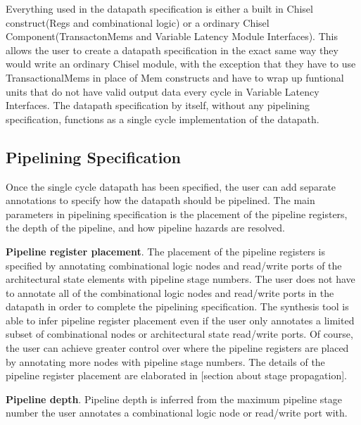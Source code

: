 Everything used in the datapath specification is either a built in
Chisel construct(Regs and combinational logic) or a ordinary Chisel
Component(TransactonMems and Variable Latency Module Interfaces). This
allows the user to create a datapath specification in the exact same
way they would write an ordinary Chisel module, with the exception
that they have to use TransactionalMems in place of Mem constructs and
have to wrap up funtional units that do not have valid output data
every cycle in Variable Latency Interfaces. The datapath specification
by itself, without any pipelining specification, functions as a single
cycle implementation of the datapath.

\subsection {Pipelining Specification}
Once the single cycle datapath has been specified, the user can add
separate annotations to specify how the datapath should be
pipelined. The main parameters in pipelining specification is the
placement of the pipeline registers, the depth of the pipeline, and
how pipeline hazards are resolved.

{\bf Pipeline register placement}. The placement of the pipeline
registers is specified by annotating combinational logic nodes and
read/write ports of the architectural state elements with pipeline
stage numbers. The user does not have to annotate all of the
combinational logic nodes and read/write ports in the datapath in
order to complete the pipelining specification. The synthesis tool is
able to infer pipeline register placement even if the user only
annotates a limited subset of combinational nodes or architectural
state read/write ports. Of course, the user can achieve greater
control over where the pipeline registers are placed by annotating
more nodes with pipeline stage numbers. The details of the pipeline
register placement are elaborated in [section about stage
  propagation].

{\bf Pipeline depth}. Pipeline depth is inferred from the maximum
pipeline stage number the user annotates a combinational logic node or
read/write port with.


